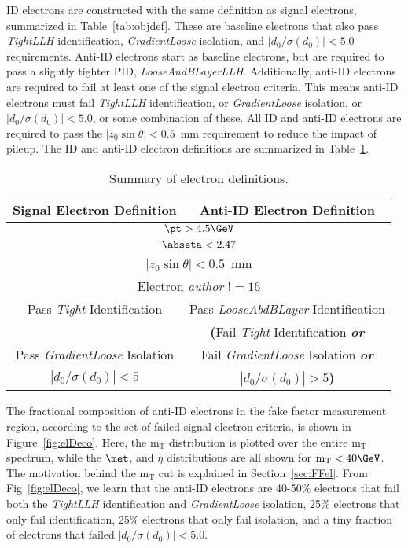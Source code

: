 ID electrons are constructed with the same definition as signal electrons, summarized in Table~\ref{tab:objdef}.  These are baseline electrons that also pass \textit{TightLLH} identification, \textit{GradientLoose} isolation, and $|d_0/\sigma(d_0)|<5.0$ requirements.  Anti-ID electrons start as baseline electrons, but are required to pass a slightly tighter PID, \textit{LooseAndBLayerLLH}.  Additionally, anti-ID electrons are required to fail at least one of the signal electron criteria.  This means anti-ID electrons must fail \textit{TightLLH} identification, or \textit{GradientLoose} isolation, or $|d_0/\sigma(d_0)|<5.0$, or some combination of these. %
All ID and anti-ID electrons are required to pass the $|z_0\sin\theta| < 0.5$~mm requirement to reduce the impact of pileup.  The ID and anti-ID electron definitions are summarized in Table~\ref{tab:AllElDefs}. 
\begin{table}[!htb]
\begin{center}
\begin{tabular}{c|c}
\hline
Signal Electron Definition  & Anti-ID Electron Definition \\
\hline \hline
\multicolumn{2}{c}{$\pt > 4.5\GeV$}      \\
\multicolumn{2}{c}{$\abseta < 2.47$ }     \\
\multicolumn{2}{c}{$|z_0\sin\theta| < 0.5$~mm} \\
\multicolumn{2}{c}{Electron \textit{author} $!= 16$}\\
Pass \textit{Tight} Identification & Pass \textit{LooseAbdBLayer} Identification\\
      &             \textbf{(}Fail \textit{Tight} Identification \textbf{\textit{or}} \\
Pass \textit{GradientLoose} Isolation  & Fail \textit{GradientLoose} Isolation \textbf{\textit{or}} \\   
$|d_0/\sigma(d_0)| < 5$  &   $|d_0/\sigma(d_0)| > 5$\textbf{)} \\
\hline
\end{tabular}
\caption{Summary of electron definitions.}
\label{tab:AllElDefs}
\end{center}
\end{table}
The fractional composition of anti-ID electrons in the fake factor measurement region, according to the set of failed signal electron criteria, is shown in Figure~\ref{fig:elDeco}. Here, the $\mathrm{m_T}$ distribution is plotted over the entire $\mathrm{m_T}$ spectrum, while the $\met$, \pt{} and $\eta$ distributions are all shown for $\mathrm{m_T} <40\GeV$.  The motivation behind the $\mathrm{m_T}$ cut is explained in Section~\ref{sec:FFel}.  From Fig~\ref{fig:elDeco}, we learn that the anti-ID electrons are 40-50$\%$ electrons that fail both the \textit{TightLLH} identification and \textit{GradientLoose} isolation, 25$\%$ electrons that only fail identification, 25$\%$ electrons that only fail isolation, and a tiny fraction of electrons that failed $|d_0/\sigma(d_0)|<5.0$. 
